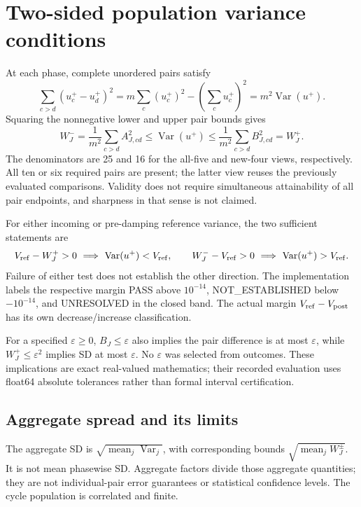 \documentclass[11pt,a4paper]{article}
\begin{document}
\clearpage
\section{Two-sided population variance conditions}\label{sec:variance}
At each phase, complete unordered pairs satisfy
\begin{equation}\label{eq:variance}
\sum_{c>d}(u_c^+-u_d^+)^2=m\sum_c(u_c^+)^2-\left(\sum_cu_c^+\right)^2
=m^2\operatorname{Var}(u^+).
\end{equation}
Squaring the nonnegative lower and upper pair bounds gives
\begin{equation}\label{eq:W}
W_J^-=\frac1{m^2}\sum_{c>d}A_{J,cd}^2
\le\operatorname{Var}(u^+)\le
\frac1{m^2}\sum_{c>d}B_{J,cd}^2=W_J^+.
\end{equation}
The denominators are 25 and 16 for the all-five and new-four views, respectively. All ten or six required pairs are present; the latter view reuses the previously evaluated comparisons. Validity does not require simultaneous attainability of all pair endpoints, and sharpness in that sense is not claimed.

For either incoming or pre-damping reference variance, the two sufficient statements are
\begin{equation}\label{eq:conditions}
V_{\rm ref}-W_J^+>0\ \Longrightarrow\ \operatorname{Var}(u^+)<V_{\rm ref},\qquad
W_J^--V_{\rm ref}>0\ \Longrightarrow\ \operatorname{Var}(u^+)>V_{\rm ref}.
\end{equation}
Failure of either test does not establish the other direction. The implementation labels the respective margin PASS above $10^{-14}$, NOT\_ESTABLISHED below $-10^{-14}$, and UNRESOLVED in the closed band. The actual margin $V_{\rm ref}-V_{\rm post}$ has its own decrease/increase classification.

For a specified $\varepsilon\ge0$, $B_J\le\varepsilon$ also implies the pair difference is at most $\varepsilon$, while $W_J^+\le\varepsilon^2$ implies SD at most $\varepsilon$. No $\varepsilon$ was selected from outcomes. These implications are exact real-valued mathematics; their recorded evaluation uses float64 absolute tolerances rather than formal interval certification.

\subsection{Aggregate spread and its limits}
The aggregate SD is $\sqrt{\operatorname{mean}_j\operatorname{Var}_j}$, with corresponding bounds $\sqrt{\operatorname{mean}_jW_J^\pm}$. It is not mean phasewise SD. Aggregate factors divide those aggregate quantities; they are not individual-pair error guarantees or statistical confidence levels. The cycle population is correlated and finite.
\end{document}

